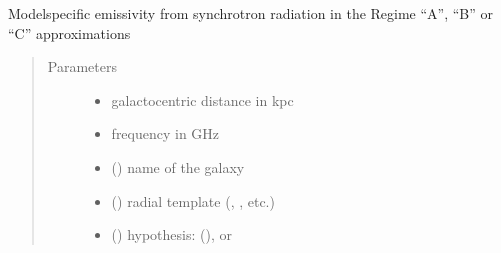 \documentclass[letterpaper,10pt,english]{sphinxmanual}
\begin{document}
\begin{fulllineitems}
\label{\detokenize{diffsph:diffsph.pyflux.synch_emissivity_approx}}
\sphinxAtStartPar
Model\sphinxhyphen{}specific emissivity from synchrotron radiation in the Regime “A”, “B” or “C” approximations
\begin{quote}\begin{description}
\item[{Parameters}] \leavevmode\begin{itemize}
\item {} 
\sphinxAtStartPar
{} \textendash{} galactocentric distance in kpc

\item {} 
\sphinxAtStartPar
{} \textendash{} frequency in GHz

\item {} 
\sphinxAtStartPar
{} () \textendash{} name of the galaxy

\item {} 
\sphinxAtStartPar
{} () \textendash{} radial template (, , etc.)

\item {} 
\sphinxAtStartPar
{} () \textendash{} hypothesis:  (),  or 


\end{itemize}
\end{description}
\end{quote}
\end{fulllineitems}
\end{document}
